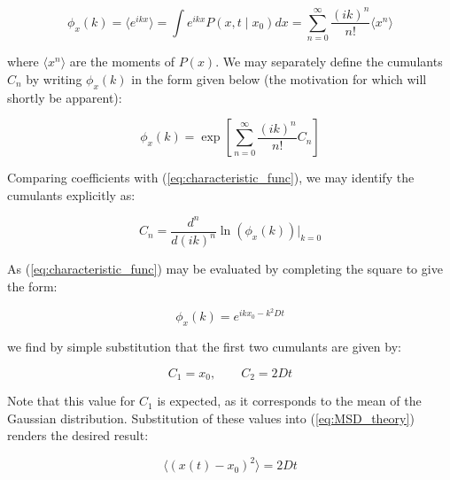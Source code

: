 \documentclass[11pt, a4paper]{article} %
\begin{document}
\begin{appendices}
\begin{equation} \label{eq:characteristic_func}
\phi_{x}(k) = \langle e^{ikx} \rangle = \int e^{ikx} P(x,t \mid x_{0}) dx = \sum_{n=0}^{\infty} \frac{(ik)^{n}}{n!}\langle x^{n} \rangle
\end{equation}

where $\langle x^{n} \rangle$ are the moments of $P(x)$. We may separately define the cumulants $C_{n}$ by writing $\phi_{x}(k)$ in the form given below (the motivation for which will shortly be apparent):

\begin{equation}
\phi_{x}(k) =  \exp \left[\sum_{n=0}^{\infty} \frac{(ik)^{n}}{n!} C_{n}  \right]
\end{equation}

Comparing coefficients with (\ref{eq:characteristic_func}), we may identify the cumulants explicitly as:

\begin{equation}
C_{n} = \frac{d^{n}}{d(ik)^{n}} \ln \left(\phi_{x}(k) \right) \biggr|_{k=0} 
\end{equation}

As (\ref{eq:characteristic_func}) may be evaluated by completing the square to give the form:

\begin{equation}
\phi_{x}(k) = e^{ikx_{0} - k^{2}Dt}
\end{equation}

we find by simple substitution that the first two cumulants are given by:

\begin{equation}
C_{1} = x_{0}, \qquad C_{2} = 2Dt
\end{equation}

Note that this value for $C_{1}$ is expected, as it corresponds to the mean of the Gaussian distribution. Substitution of these values into (\ref{eq:MSD_theory}) renders the desired result:

\begin{equation}
\langle (x(t) - x_{0})^{2} \rangle = 2Dt
\end{equation}


\end{appendices}
\end{document}
